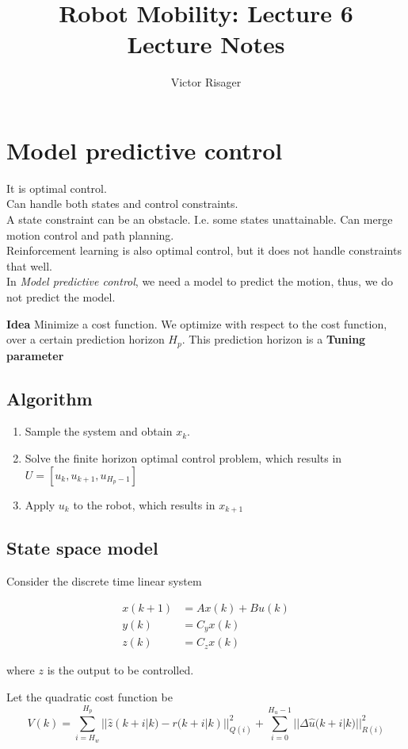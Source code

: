 \documentclass[a4paper]{article}
\title{Robot Mobility: Lecture 6 \\
	\large Lecture Notes}
\author{Victor Risager}
\begin{document}
\maketitle
\section{Model predictive control}
It is optimal control. \\
Can handle both states and control constraints. \\
A state constraint can be an obstacle. I.e. some states unattainable.
Can merge motion control and path planning. \\
Reinforcement learning is also optimal control, but it does not handle constraints that well. \\
In \textit{Model predictive control}, we need a model to predict the motion, thus, we do not predict the model. 

\textbf{Idea} 
Minimize a cost function. We optimize with respect to the cost function, over a certain prediction horizon $ H_p $. This prediction horizon is a  \textbf{Tuning parameter} 
\subsection{Algorithm}
\begin{enumerate}
	\item Sample the system and obtain $ x_k $.
	\item Solve the finite horizon optimal control problem, which results in $ U = [u_k , u_{k+1}, u_{H_p - 1}]$
	\item Apply $ u_k $ to the robot, which results in  $ x_{k+1} $
\end{enumerate}



\subsection{State space model}
Consider the discrete time linear system 

\begin{align}
x(k+1) &= A x(k) + B u(k)  \\
y(k) &= C_y x(k) \\
z(k) &= C_z x(k) 
\end{align}

where $ z $ is the output to be controlled.


Let the quadratic cost function be 
\begin{equation}\label{eq1}
	V(k) = \sum_{i = H_w}^{H_p}{|| \hat{z}(k+i|k) - r(k+i|k)||_{Q(i)}^{2}} + \sum_{i=0}^{H_u-1}{|| \Delta \hat{u} (k+i | k) ||_{R(i)}^{2} }
\end{equation}
\end{document}
